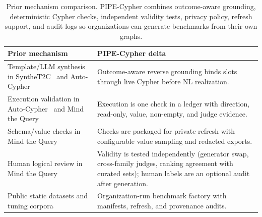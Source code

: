 \begin{table}[H]
\centering
\footnotesize
\begin{tabular}{@{}p{}p{}@{}}
\toprule
Prior mechanism & PIPE-Cypher delta \\
\midrule
Template/LLM synthesis in SyntheT2C~\citep{synthet2c2025} and Auto-Cypher~\citep{autocypher2025} & Outcome-aware reverse grounding binds slots through live Cypher before NL realization. \\
Execution validation in Auto-Cypher~\citep{autocypher2025} and Mind the Query~\citep{mindthequery2025} & Execution is one check in a ledger with direction, read-only, value, non-empty, and judge evidence. \\
Schema/value checks in Mind the Query~\citep{mindthequery2025} & Checks are packaged for private refresh with configurable value sampling and redacted exports. \\
Human logical review in Mind the Query~\citep{mindthequery2025} & Validity is tested independently (generator swap, cross-family judges, ranking agreement with curated sets); human labels are an optional audit after generation. \\
Public static datasets and tuning corpora~\citep{text2cypher2025,cypherbench2025,text2cypher2024dataset} & Organization-run benchmark factory with manifests, refresh, and provenance audits. \\
\bottomrule
\end{tabular}
\caption{Prior mechanism comparison. PIPE-Cypher combines outcome-aware grounding, deterministic Cypher checks, independent validity tests, privacy policy, refresh support, and audit logs so organizations can generate benchmarks from their own graphs.}
\label{tab:prior_mechanism_comparison}
\end{table}
